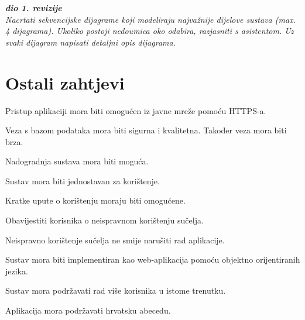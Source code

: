				\textbf{\textit{dio 1. revizije}}\\
				
				\textit{Nacrtati sekvencijske dijagrame koji modeliraju najvažnije dijelove sustava (max. 4 dijagrama). Ukoliko postoji nedoumica oko odabira, razjasniti s asistentom. Uz svaki dijagram napisati detaljni opis dijagrama.}
				\eject
	
		\section{Ostali zahtjevi}
			 
			 \begin{packed_item}
			 	
			 	\item Pristup aplikaciji mora biti omogućen iz javne mreže pomoću HTTPS-a.
			 	\item Veza s bazom podataka mora biti sigurna i kvalitetna. Također veza mora biti brza.
			 	\item Nadogradnja sustava mora biti moguća.
			 	\item Sustav mora biti jednostavan za korištenje.
			 	\item Kratke upute o korištenju moraju biti omogućene.
			 	\item Obavijestiti korisnika o neispravnom korištenju sučelja.
			 	\item Neispravno korištenje sučelja ne smije narušiti rad aplikacije.
			 	\item Sustav mora biti implementiran kao web-aplikacija pomoću objektno orijentiranih jezika.
			 	\item Sustav mora podržavati rad više korisnika u istome trenutku.
			 	\item Aplikacija mora podržavati hrvatsku abecedu.
			 	
			 \end{packed_item}
			 
			 
	